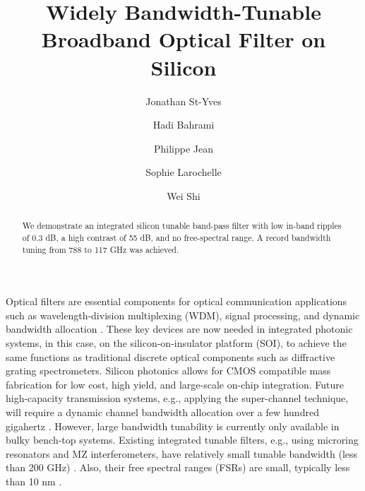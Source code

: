 \documentclass[osajnl,twocolumn,showpacs,superscriptaddress,10pt]{revtex4-1}
\begin{document}
\title{Widely Bandwidth-Tunable Broadband Optical Filter on Silicon}

\author{Jonathan St-Yves} 
\author{Hadi Bahrami}
\author{Philippe Jean}
\author{Sophie Larochelle}
\author{Wei Shi}


\begin{abstract}
We demonstrate an integrated silicon tunable band-pass filter with low in-band ripples of 0.3 dB, a high contrast of 55 dB, and no free-spectral range. 
A record bandwidth tuning from 788 to 117 GHz was achieved.
\end{abstract}



\maketitle



Optical filters are essential components for optical communication applications such as wavelength-division multiplexing (WDM), signal processing, and dynamic bandwidth allocation \cite{DynamicBW}.
These key devices are now needed in integrated photonic systems, in this case, on the silicon-on-insulator platform (SOI), to achieve the same functions as traditional discrete optical components such as diffractive grating spectrometers. 
Silicon photonics allows for CMOS compatible mass fabrication for low cost, high yield, and large-scale on-chip integration. 
Future high-capacity transmission systems, e.g., applying the super-channel technique, will require a dynamic channel bandwidth allocation over a few hundred gigahertz \cite{jinno2009spectrum}. 
However, large bandwidth tunability is currently only available in bulky bench-top systems. Existing integrated tunable filters, e.g., using microring resonators and MZ interferometers, have relatively small tunable bandwidth (less than 200 GHz)  \cite{ong2013ultra}. 
Also, their free spectral ranges (FSRs) are small, typically less than 10 nm \cite{ong2013ultra}. 
\end{document}
